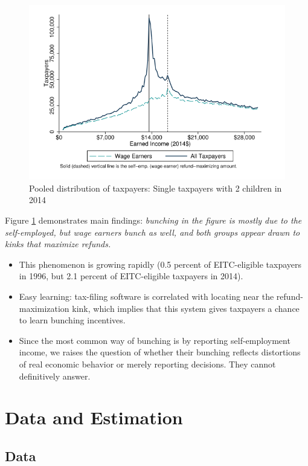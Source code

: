 \documentclass[../root]{subfiles}
\begin{document}
    \begin{figure}[t]
        \centering
        \includegraphics[width = 0.8\linewidth]{0626kato/fig1.PNG}
        \caption{Pooled distribution of taxpayers: Single taxpayers with 2 children in 2014}
        \label{fig1}
    \end{figure}

    Figure \ref{fig1} demonstrates main findings:
    \textit{bunching in the figure is mostly due to the self-employed, 
    but wage earners bunch as well,
    and both groups appear drawn to kinks that maximize refunds.}
    \begin{itemize}
        \item This phenomenon is growing rapidly (0.5 percent of EITC-eligible taxpayers in 1996, but 2.1 percent of EITC-eligible taxpayers in 2014).
        \item Easy learning: tax-filing software is correlated with locating near the refund-maximization kink, which implies that this system gives taxpayers a chance to learn bunching incentives.
        \item Since the most common way of bunching is by reporting self-employment income, we raises the question of whether their bunching reflects distortions of real economic behavior or merely reporting decisions. They cannot definitively answer.
    \end{itemize}

    
    \section{Data and Estimation}

    \subsection{Data}
\end{document}
